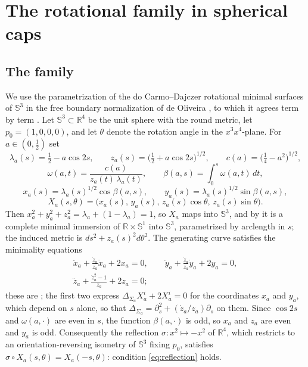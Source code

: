 \documentclass[10pt,a4paper]{amsart}
\newcommand{\R}{\mathbb{R}}
\newcommand{\Sph}{\mathbb{S}}
\begin{document}
\section{The rotational family in spherical caps}\label{sec:caps}

\subsection*{The family}

We use the parametrization of the do Carmo--Dajczer rotational minimal surfaces of $\Sph^3$ in the free boundary normalization of de Oliveira \cite{dO24}, to which it agrees term by term \cite[eq. (1)--(6)]{dO24}. Let $\Sph^3\subset\R^4$ be the unit sphere with the round metric, let $p_0=(1,0,0,0)$, and let $\theta$ denote the rotation angle in the $x^3x^4$-plane. For $a\in(0,\tfrac12)$ set
\begin{equation}\label{eq:dO-defs}
\lambda_a(s)=\tfrac12-a\cos 2s,\qquad z_a(s)=\bigl(\tfrac12+a\cos 2s\bigr)^{1/2},\qquad c(a)=\bigl(\tfrac14-a^2\bigr)^{1/2},
\end{equation}
\begin{equation}\label{eq:dO-omega}
\omega(a,t)=\frac{c(a)}{z_a(t)\,\lambda_a(t)},\qquad \beta(a,s)=\int_0^s\omega(a,t)\,dt,
\end{equation}
\begin{equation}\label{eq:dO-imm}
x_a(s)=\lambda_a(s)^{1/2}\cos\beta(a,s),\qquad y_a(s)=\lambda_a(s)^{1/2}\sin\beta(a,s),
\end{equation}
\begin{equation}\label{eq:dO-X}
X_a(s,\theta)=\bigl(x_a(s),\,y_a(s),\,z_a(s)\cos\theta,\,z_a(s)\sin\theta\bigr).
\end{equation}
Then $x_a^2+y_a^2+z_a^2=\lambda_a+(1-\lambda_a)=1$, so $X_a$ maps into $\Sph^3$, and by \cite[Prop. 2.1]{dO24} it is a complete minimal immersion of $\R\times\Sph^1$ into $\Sph^3$, parametrized by arclength in $s$; the induced metric is $ds^2+z_a(s)^2d\theta^2$. The generating curve satisfies the minimality equations
\begin{equation}\label{eq:dO-ode}
\begin{gathered}
\ddot x_a+\frac{\dot z_a}{z_a}\dot x_a+2x_a=0,\qquad
\ddot y_a+\frac{\dot z_a}{z_a}\dot y_a+2y_a=0,\\[2pt]
\ddot z_a+\frac{\dot z_a^2-1}{z_a}+2z_a=0 ;
\end{gathered}
\end{equation}
these are \cite[eq. (9)--(11)]{dO24}; the first two express $\Delta_{\Sigma_a}X_a^i+2X_a^i=0$ for the coordinates $x_a$ and $y_a$, which depend on $s$ alone, so that $\Delta_{\Sigma_a}=\partial_s^2+(\dot z_a/z_a)\partial_s$ on them.
Since $\cos 2s$ and $\omega(a,\cdot)$ are even in $s$, the function $\beta(a,\cdot)$ is odd, so $x_a$ and $z_a$ are even and $y_a$ is odd. Consequently the reflection $\sigma:x^2\mapsto-x^2$ of $\R^4$, which restricts to an orientation-reversing isometry of $\Sph^3$ fixing $p_0$, satisfies $\sigma\circ X_a(s,\theta)=X_a(-s,\theta)$: condition \eqref{eq:reflection} holds.
\end{document}
